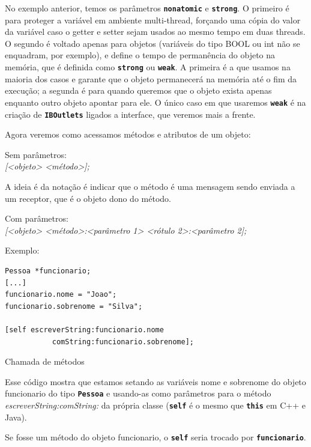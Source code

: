 \documentclass[a4paper,12pt,brazil,doubleside]{book}
\begin{document}
\begin{singlespace}
No exemplo anterior, temos os parâmetros \texttt{\textbf{nonatomic}} e \texttt{\textbf{strong}}. O primeiro é para proteger a variável em ambiente multi-thread, forçando uma cópia do valor da variável caso o getter e setter sejam usados ao mesmo tempo em duas threads. O segundo é voltado apenas para objetos (variáveis do tipo BOOL ou int não se enquadram, por exemplo), e define o tempo de permanência do objeto na memória, que é definida como \texttt{\textbf{strong}} ou \texttt{\textbf{weak}}. A primeira é a que usamos na maioria dos casos e garante que o objeto permanecerá na memória até o fim da execução; a segunda é para quando queremos que o objeto exista apenas enquanto outro objeto apontar para ele. O único caso em que usaremos \texttt{\textbf{weak}} é na criação de \texttt{\textbf{IBOutlets}} ligados a interface, que veremos mais a frente.


Agora veremos como acessamos métodos e atributos de um objeto:


Sem parâmetros:\\
\emph{[<objeto> <método>];}


A ideia é da notação é indicar que o método é uma mensagem sendo enviada a um receptor, que é o objeto dono do método.


Com parâmetros:\\
\emph{[<objeto> <método>:<parâmetro 1> <rótulo 2>:<parâmetro 2];}


Exemplo:

\begin{listing}
\begin{verbatim}
Pessoa *funcionario;
[...]
funcionario.nome = "Joao";
funcionario.sobrenome = "Silva";

[self escreverString:funcionario.nome
           comString:funcionario.sobrenome];
\end{verbatim}
\caption{Chamada de métodos}
\end{listing}


Esse código mostra que estamos setando as variáveis nome e sobrenome do objeto funcionario do tipo \texttt{\textbf{Pessoa}} e usando-as como parâmetros para o método \emph{escreverString:comString:} da própria classe (\texttt{\textbf{self}} é o mesmo que \texttt{\textbf{this}} em C++ e Java).

Se fosse um método do objeto funcionario, o \texttt{\textbf{self}} seria trocado por \texttt{\textbf{funcionario}}.

\begin{framed}


\end{framed}
\end{singlespace}
\end{document}
